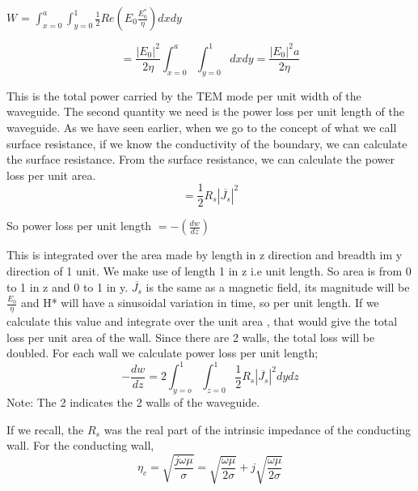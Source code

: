 \begin{center}
$W$ = $\int_{x=0}^{a}\int_{y=0}^{1}\frac{1}{2}Re(E_0 \frac{E_0^*}{\eta})dxdy$

\end{center}
\begin{equation}
= \frac{\left|E_{0}\right|^2}{2\eta}\int_{x=0}^{a}\int_{y=0}^{1}dxdy = \frac{|E_0|^2a}{2\eta}
\end{equation}


This is the total power carried by the TEM mode per unit width of the waveguide. The second quantity we need is the power loss per unit length of the waveguide. As we have seen earlier, when we go to the concept of what we call surface resistance, if we know the conductivity of the boundary, we can calculate the surface resistance. From the surface resistance, we can calculate the power loss per unit area.
\begin{equation}
=\frac{1}{2}R_s|\overline{J_s}|^2 
\end{equation}

So power loss per unit length 
$ =-(\frac{dw}{dz}) $

This is integrated over the area made by length in z direction and breadth im y direction of 1  unit. We make use of length 1 in z i.e unit length. So area is from 0 to 1 in z and 0 to 1 in y. $ \overline{J_s} $ is the same as a magnetic field, its magnitude will be $ \frac{E_0}{\eta} $ and H* will have a sinusoidal variation in time, so per unit length. If we calculate this value and integrate over the unit area 
, that would give the total loss per unit area of the wall. Since there are 2 walls, the total loss will be doubled. For each wall we calculate
power loss per unit length; 
\begin{equation}
-\frac{dw}{dz}= 2 \int_{y=o}^{1} \int_{z=0}^{1}\frac{1}{2}R_s|\overline{J_s}|^2dydz
\end{equation}
Note: The 2 indicates the 2 walls of the waveguide. 

If we recall, the $R_s$ was the real part of the intrinsic impedance of the conducting wall. For the conducting wall,
$$\eta_c = \sqrt{\frac{j\omega\mu}{\sigma}}= \sqrt{\frac{\omega\mu}{2\sigma}}+j\sqrt{\frac{\omega\mu}{2\sigma}}$$

